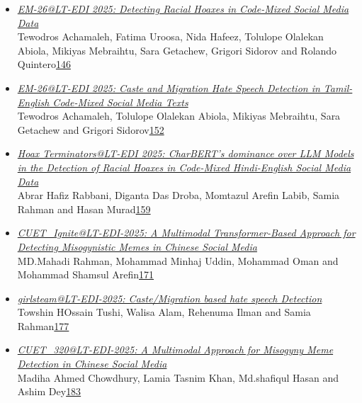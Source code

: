 \documentclass[11pt,oneside]{book}
\begin{document}
\begin{itemize}[leftmargin=*,label={}]
       \item \hyperlink{page.146}{\emph{EM-26@LT-EDI 2025: Detecting Racial Hoaxes in Code-Mixed Social Media Data}}\\ \hspace*{2em} Tewodros Achamaleh, Fatima Uroosa, Nida Hafeez, Tolulope Olalekan Abiola, Mikiyas Mebraihtu, Sara Getachew, Grigori Sidorov and Rolando Quintero\dotfill \hyperlink{page.146}{146}
       \item \hyperlink{page.152}{\emph{EM-26@LT-EDI 2025: Caste and Migration Hate Speech Detection in Tamil-English Code-Mixed Social Media Texts}}\\ \hspace*{2em} Tewodros Achamaleh, Tolulope Olalekan Abiola, Mikiyas Mebraihtu, Sara Getachew and Grigori Sidorov\dotfill \hyperlink{page.152}{152}
       \item \hyperlink{page.159}{\emph{Hoax Terminators@LT-EDI 2025: CharBERT's dominance over LLM Models in the Detection of Racial Hoaxes in Code-Mixed Hindi-English Social Media Data}}\\ \hspace*{2em} Abrar Hafiz Rabbani, Diganta Das Droba, Momtazul Arefin Labib, Samia Rahman and Hasan Murad\dotfill \hyperlink{page.159}{159}
       \item \hyperlink{page.171}{\emph{CUET\_Ignite@LT-EDI-2025: A Multimodal Transformer-Based Approach for Detecting Misogynistic Memes in Chinese Social Media}}\\ \hspace*{2em} MD.Mahadi Rahman, Mohammad Minhaj Uddin, Mohammad Oman and Mohammad Shamsul Arefin\dotfill \hyperlink{page.171}{171}
       \item \hyperlink{page.177}{\emph{girlsteam@LT-EDI-2025: Caste/Migration based hate speech Detection}}\\ \hspace*{2em} Towshin HOssain Tushi, Walisa Alam, Rehenuma Ilman and Samia Rahman\dotfill \hyperlink{page.177}{177}
       \item \hyperlink{page.183}{\emph{CUET\_320@LT-EDI-2025: A Multimodal Approach for Misogyny Meme Detection in Chinese Social Media}}\\ \hspace*{2em} Madiha Ahmed Chowdhury, Lamia Tasnim Khan, Md.shafiqul Hasan and Ashim Dey\dotfill \hyperlink{page.183}{183}

\end{itemize}
\end{document}
